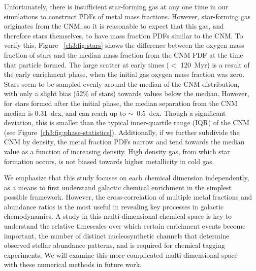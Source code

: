 Unfortunately, there is insufficient star-forming gas at any one time in our simulations to construct PDFs of metal mass fractions. However, star-forming gas originates from the CNM, so it is reasonable to expect that this gas, and therefore stars themselves, to have mass fraction PDFs similar to the CNM. To verify this, Figure ~\ref{ch3:fig:stars} shows the difference between the oxygen mass fraction of stars and the median mass fraction from the CNM PDF at the time that particle formed. The large scatter at early times ($<$ 120~Myr) is a result of the early enrichment phase, when the initial gas oxygen mass fraction was zero. Stars seem to be sampled evenly around the median of the CNM distribution, with only a slight bias (52\% of stars) towards values below the median. However, for stars formed after the initial phase, the median separation from the CNM median is 0.31~dex, and can reach up to $\sim$~0.5~dex. Though a significant deviation, this is smaller than the typical inner-quartile range (IQR) of the CNM (see Figure~\ref{ch3:fig:phase-statistics}). Additionally, if we further subdivide the CNM by density, the metal fraction PDFs narrow and tend towards the median value as a function of increasing density. High density gas, from which star formation occurs, is not biased towards higher metallicity in cold gas.

We emphasize that this study focuses on each chemical dimension independently, as a means to first understand galactic chemical enrichment in the simplest possible framework. However, the cross-correlation of multiple metal fractions and abundance ratios is the most useful in revealing key processes in galactic chemodynamics. A study in this multi-dimensional chemical space is key to understand the relative timescales over which certain enrichment events become important, the number of distinct nucleosynthetic channels that determine observed stellar abundance patterns, and is required for chemical tagging experiments. We will examine this more complicated multi-dimensional space with these numerical methods in future work.

